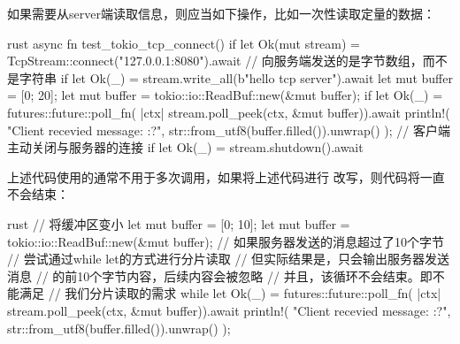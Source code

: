 如果需要从server端读取信息，则应当如下操作，比如一次性读取定量的数据：
\begin{code-block}{rust}
async fn test_tokio_tcp_connect() {
    if let Ok(mut stream) = TcpStream::connect("127.0.0.1:8080").await {
        // 向服务端发送的是字节数组，而不是字符串
        if let Ok(_) = stream.write_all(b"hello tcp server").await {
            let mut buffer = [0; 20];
            let mut buffer = tokio::io::ReadBuf::new(&mut buffer);
            if let Ok(_) =
                futures::future::poll_fn(
                    |ctx| stream.poll_peek(ctx, &mut buffer)).await
            {
                println!(
                    "Client recevied message: {:?}",
                    str::from_utf8(buffer.filled()).unwrap()
                );
            }
            // 客户端主动关闭与服务器的连接
            if let Ok(_) = stream.shutdown().await {}
        }
    }
}
\end{code-block}
\begin{critical}
上述代码使用的通常不用于多次调用，如果将上述代码进行
改写，则代码将一直不会结束：
\begin{code-block}{rust}
// 将缓冲区变小
let mut buffer = [0; 10];
let mut buffer = tokio::io::ReadBuf::new(&mut buffer);
// 如果服务器发送的消息超过了10个字节
// 尝试通过while let的方式进行分片读取
// 但实际结果是，只会输出服务器发送消息
// 的前10个字节内容，后续内容会被忽略
// 并且，该循环不会结束。即不能满足
// 我们分片读取的需求
while let Ok(_) =
    futures::future::poll_fn(
        |ctx| stream.poll_peek(ctx, &mut buffer)).await
{
    println!(
        "Client recevied message: {:?}",
        str::from_utf8(buffer.filled()).unwrap()
    );
}
\end{code-block}
\end{critical}

